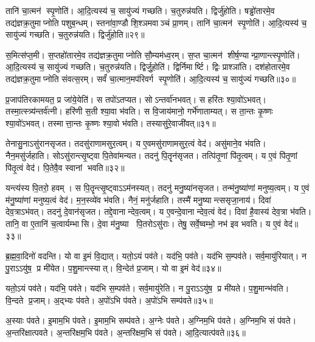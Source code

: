 तानि॑ चा॒त्मन॑ स्पृ॒णोति॑।
आ॒दि॒त्यस्य॑ च॒ सायु॑ज्यं गच्छति।
च॒तुरुन्न॑यति।
द्विर्जु॑होति।
षड्ढो॑तारमे॒व तद्य॑ज्ञक्र॒तुमाप्नोति पशुब॒न्धम्।
स्तना॑वा॒ण्डौ शि॒श्ञमवाञ्चं प्रा॒णम्।
तानि॑ चा॒त्मन॑ स्पृ॒णोति॑।
आ॒दि॒त्यस्य॑ च॒ सायु॑ज्यं गच्छति।
च॒तुरुन्न॑यति।
द्विर्जु॑होति॥२९॥

स॒मित्स॑प्त॒मी।
स॒प्तहो॑तारमे॒व तद्य॑ज्ञक्र॒तुमाप्नोति सौ॒म्यम॑ध्व॒रम्।
स॒प्त चा॒त्मन॑ शीर्\mbox{}ष॒ण्यान्प्रा॒णान्त्स्पृ॒णोति॑।
आ॒दि॒त्यस्य॑ च॒ सायु॑ज्यं गच्छति।
च॒तुरुन्न॑यति।
द्विर्जु॒होति॑।
द्विर्निमार्ष्टि।
द्विः प्राश्ञा॑ति।
दश॑होतारमे॒व तद्य॑ज्ञक्र॒तुमाप्नोति संवत्स॒रम्।
सर्वं॑ चा॒त्मान॒मप॑रिवर्ग स्पृ॒णोति॑।
आ॒दि॒त्यस्य॑ च॒ सायु॑ज्यं गच्छति॥३०॥\anuvakamend[अ॒ग्नि॒हो॒त्रं म॒ज्जान॒न्द्विर्जु॑हो॒त्यप॑रिवर्ग स्पृ॒णोत्येकं च]

प्र॒जाप॑तिरकामयत॒ प्र जा॑ये॒येति॑।
स तपो॑ऽतप्यत।
सोऽन्तर्वा॑नभवत्।
स हरि॑तः श्या॒वो॑ऽभवत्।
तस्मा॒त्स्त्र्य॑न्तर्व॑त्नी।
हरि॑णी स॒ती श्या॒वा भ॑वति।
स वि॒जाय॑मानो॒ गर्भे॑णाताम्यत्।
स ता॒न्तः कृ॒ष्णः श्या॒वो॑ऽभवत्।
तस्मात्ता॒न्तः कृ॒ष्णः श्या॒वो भ॑वति।
तस्यासु॑रे॒वाजी॑वत्॥३१॥

तेनासु॒नाऽसु॑रानसृजत।
तदसु॑राणामसुर॒त्वम्।
य ए॒वमसु॑राणामसुर॒त्वं वेद॑।
असु॑माने॒व भ॑वति।
नैन॒मसु॑र्जहाति।
सोऽसु॑रान्त्सृ॒ष्ट्वा पि॒तेवा॑मन्यत।
तदनु॑ पि॒तॄन॑सृजत।
तत्पि॑तृ॒णां पि॑तृ॒त्वम्।
य ए॒वं पि॑तृ॒णां पि॑तृ॒त्वं वेद॑।
पि॒तेवै॒व स्वानां भवति॥३२॥

यन्त्य॑स्य पि॒तरो॒ हवम्।
स पि॒तॄन्त्सृ॒ष्ट्वाऽऽम॑नस्यत्।
तदनु॑ मनु॒ष्या॑नसृजत।
तन्म॑नु॒ष्या॑णां मनुष्य॒त्वम्।
य ए॒वं म॑नु॒ष्या॑णां मनुष्य॒त्वं वेद॑।
म॒न॒स्व्ये॑व भ॑वति।
नैनं॒ मनु॑र्जहाति।
तस्मै॑ मनु॒ष्यान्त्ससृजा॒नाय॑।
दिवा॑ देव॒त्राऽभ॑वत्।
तदनु॑ दे॒वान॑सृजत।
तद्दे॒वानान्देव॒त्वम्।
य ए॒वन्दे॒वानान्देव॒त्वं वेद॑।
दिवा॑ है॒वास्य॑ देव॒त्रा भ॑वति।
तानि॒ वा ए॒तानि॑ च॒त्वार्यम्भासि।
दे॒वा म॑नु॒ष्या पि॒तरोऽसु॑राः।
तेषु॒ सर्वे॒ष्वम्भो॒ नभ॑ इव भवति।
य ए॒वं वेद॑॥३३॥\anuvakamend[अ॒जी॒व॒त्स्वानां भवति दे॒वान॑सृजत स॒प्त च॑]

ब्र॒ह्म॒वा॒दिनो॑ वदन्ति।
यो वा इ॒मं वि॒द्यात्।
यतो॒ऽयं पव॑ते।
यद॑भि॒ पव॑ते।
यद॑भि स॒म्पव॑ते।
सर्व॒मायु॑रियात्।
न पु॒राऽऽयु॑ष॒ प्र मी॑येत।
प॒शु॒मान्त्स्यात्।
वि॒न्देत॑ प्र॒जाम्।
यो वा इ॒मं वेद॑॥३४॥

यतो॒ऽयं पव॑ते।
यद॑भि॒ पव॑ते।
यद॑भि स॒म्पव॑ते।
सर्व॒मायु॑रेति।
न पु॒राऽऽयु॑ष॒ प्र मी॑यते।
प॒शु॒मान्भ॑वति।
वि॒न्दते प्र॒जाम्।
अ॒द्भ्यः प॑वते।
अ॒पो॑ऽभि प॑वते।
अ॒पो॑ऽभि सम्प॑वते॥३५॥

अ॒स्याः प॑वते।
इ॒माम॒भि प॑वते।
इ॒माम॒भि सम्प॑वते।
अ॒ग्नेः प॑वते।
अ॒ग्निम॒भि प॑वते।
अ॒ग्निम॒भि सं प॑वते।
अ॒न्तरि॑क्षात्पवते।
अ॒न्तरि॑क्षम॒भि प॑वते।
अ॒न्तरि॑क्षम॒भि सं प॑वते।
आ॒दि॒त्यात्प॑वते॥३६॥

